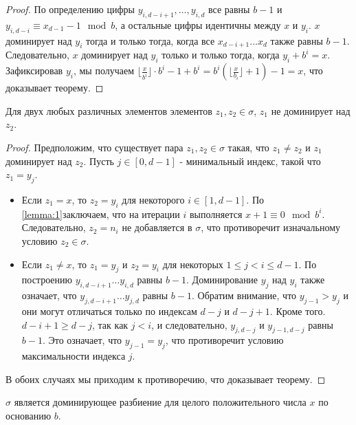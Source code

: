 \begin{proof}
	По определению цифры $y_{i, d - i + 1}, \dots, y_{i, d}$ все равны $b - 1$ и $y_{i, d - i} \equiv x_{d - 1} - 1 \mod b$, а остальные цифры идентичны между $x$ и $y_i$.
	$x$ доминирует над $y_i$ тогда и только тогда, когда все $x_{d - i + 1} \dots x_d$ также равны $b - 1$.
	Следовательно, $x$ доминирует над $y_i$ только и только тогда, когда $y_i + b^i = x$.
	Зафиксировав $y_i$, мы получаем $\lfloor \frac{x}{b^i} \rfloor \cdot b^i - 1 + b^i = b^i \left( \lfloor \frac{x}{b_i} \rfloor + 1 \right) - 1 = x$, что доказывает теорему.
\end{proof}

\begin{theorem}
	\label{lemma:2}
	Для двух любых различных элементов элементов $z_1, z_2 \in \sigma$, $z_1$ не доминирует над $z_2$.
\end{theorem}

\begin{proof}
	Предположим, что существует пара $z_1, z_2 \in \sigma$ такая, что $z_1 \neq z_2$ и $z_1$ доминирует над $z_2$.
	Пусть $j \in [0, d - 1]$ - минимальный индекс, такой что $z_1 = y_j$.
	\begin{itemize}
		\item Если $z_1 = x$, то $z_2 = y_i$ для некоторого $i \in [1, d - 1]$. По \ref{lemma:1}заключаем, что на итерации $i$ выполняется $x + 1 \equiv 0 \mod b^i$. Следовательно, $z_2 = n_i$ не добавляется в $\sigma$, что противоречит изначальному условию $z_2 \in \sigma$.
		\item Если $z_1 \neq x$, то $z_1 = y_j$ и $z_2 = y_i$ для некоторых $1 \leq j < i \leq d - 1$. По построению $y_{i, d - i + 1} \dots y_{i, d}$ равны $b - 1$. Доминирование $y_j$ над $y_i$ также означает, что $y_{j, d - i + 1} \dots y_{j, d}$ равны $b - 1$. Обратим внимание, что $y_{j - 1} > y_j$ и они могут отличаться только по индексам $d - j$ и $d - j + 1$. Кроме того. $d - i + 1 \geq d - j$, так как $j < i$, и следовательно, $y_{j, d - j}$ и $y_{j - 1, d - j}$ равны $b - 1$. Это означает, что $y_{j - 1} = y_j$, что противоречит условию максимальности индекса $j$.
	\end{itemize}
	В обоих случаях мы приходим к противоречию, что доказывает теорему.
\end{proof}

\begin{theorem}
	\label{lemma:3}
	$\sigma$ является доминирующее разбиение для целого положительного числа $x$ по основанию $b$.
\end{theorem}

